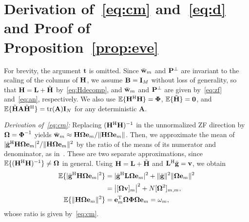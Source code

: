 \documentclass[journal]{IEEEtran}
\begin{document}
\section{Derivation of~\eqref{eq:cm} and~\eqref{eq:d} and Proof of Proposition~\ref{prop:eve}}\label{app:det}
For brevity, the argument $\bt$ is omitted. Since $\wb_m$ and $\PHp$ are invariant to the scaling of the columns of $\bH$, we assume $\bB=\bI_M$ without loss of generality, so that $\bH=\bL+\Htl$ by~\eqref{eq:Hdecomp}, and $\wb_m$ and $\PHp$ are given by~\eqref{eq:zf} and~\eqref{eq:an}, respectively. We also use $\E\{\bH^{\mathrm H}\bH\}=\bPhi$, $\E\{\Htl\}=\mathbf 0$, and $\E\{\Htl\mathbf A\Htl^{\mathrm H}\}=\tr(\mathbf A)\bI_N$ for any deterministic $\mathbf A$.

\textit{Derivation of~\eqref{eq:cm}:} Replacing $(\bH^{\mathrm H}\bH)^{-1}$ in the unnormalized ZF direction by $\bOm=\bPhi^{-1}$ yields $\wb_m\approx\bH\bOm\be_m/\|\bH\bOm\be_m\|$. Then, we approximate the mean of $|\gb^{\mathrm H}\bH\bOm\be_m|^2/\|\bH\bOm\be_m\|^2$ by the ratio of the means of its numerator and denominator, as in~\cite[Lemma~1]{ZhangJSTSP2014}. These are two separate approximations, since $\E\{(\bH^{\mathrm H}\bH)^{-1}\}\neq\bOm$ in general. Using $\bH=\bL+\Htl$ and $\bL^{\mathrm H}\gb=\bv$, we obtain
\begin{align}
\E\{|\gb^{\mathrm H}\bH\bOm\be_m|^2\}&=|\gb^{\mathrm H}\bL\bOm\be_m|^2+\|\gb\|^2\|\bOm\be_m\|^2\nonumber\\
&=\big|[\bOm\bv]_m\big|^2+N[\bOm^2]_{m,m},\label{eq:app1}\\
\E\{\|\bH\bOm\be_m\|^2\}&=\be_m^{\mathrm T}\bOm\bPhi\bOm\be_m=\omega_m,\label{eq:app2}
\end{align}
whose ratio is given by~\eqref{eq:cm}.
\end{document}
